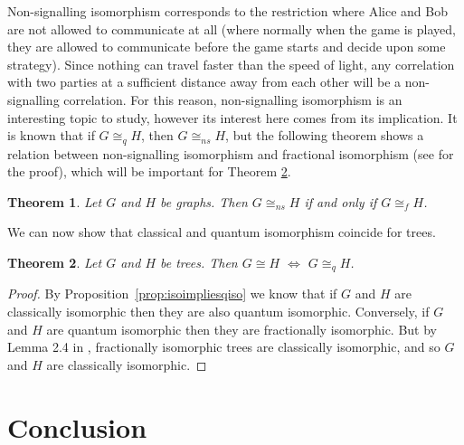 \documentclass[12pt]{article}
\newtheorem{thm}{Theorem}[section]
\begin{document}
Non-signalling isomorphism corresponds to the restriction where Alice
and Bob are not allowed to communicate at all (where normally when the
game is played, they are allowed to communicate before the game starts
and decide upon some strategy). Since nothing can travel faster than
the speed of light, any correlation with two parties at a sufficient
distance away from each other will be a non-signalling
correlation. For this reason, non-signalling isomorphism is an
interesting topic to study, however its interest here comes from its
implication. It is known that if $G \cong_q H$, then $G \cong_{ns}H$,
but the following theorem shows a relation between non-signalling
isomorphism and fractional isomorphism (see \cite{amrssv2016} for the
proof), which will be important for Theorem \ref{Trees}.

\begin{thm}
  Let $G$ and $H$ be graphs. Then $G \cong_{ns} H$ if and only if $G
  \cong_f H$.
\end{thm}

We can now show that classical and quantum isomorphism coincide for
trees.

\begin{thm}
  \label{Trees}
  Let $G$ and $H$ be trees. Then $G \cong H$ $\Leftrightarrow$ $G
  \cong_q H$.
\end{thm}

\begin{proof}
By Proposition~\ref{prop:isoimpliesqiso} we know that if $G$ and $H$
are classically isomorphic then they are also quantum
isomorphic. Conversely, if $G$ and $H$ are quantum isomorphic then
they are fractionally isomorphic. But by Lemma 2.4 in \cite{rsu1994},
fractionally isomorphic trees are classically isomorphic, and so $G$
and $H$ are classically isomorphic.
\end{proof}

\section{Conclusion}
\label{sec:conc}
\end{document}
